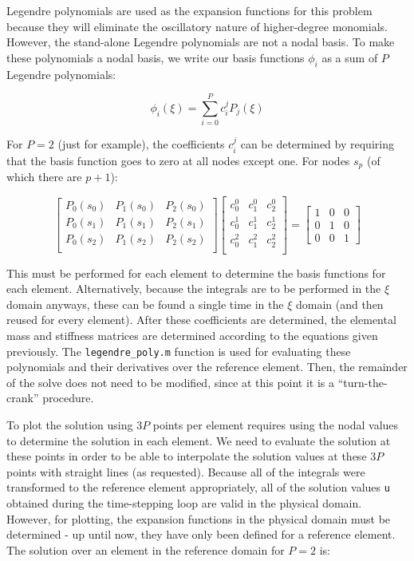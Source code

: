 \documentclass[10pt]{article}
\newcommand{\beq}{\begin{equation}}
\newcommand{\eeq}{\end{equation}}
\begin{document}
Legendre polynomials are used as the expansion functions for this problem because they will eliminate the oscillatory nature of higher-degree monomials. However, the stand-alone Legendre polynomials are not a nodal basis. To make these polynomials a nodal basis, we write our basis functions \(\phi_i\) as a sum of \(P\) Legendre polynomials:

\beq
\phi_i(\xi)=\sum_{i=0}^Pc_i^jP_j(\xi)
\eeq

For \(P=2\) (just for example), the coefficients \(c_i^j\) can be determined by requiring that the basis function goes to zero at all nodes except one. For nodes \(s_p\) (of which there are \(p+1\)):

\beq
\begin{bmatrix}
P_0(s_0) & P_1(s_0) & P_2(s_0)\\
P_0(s_1) & P_1(s_1) & P_2(s_1)\\
P_0(s_2) & P_1(s_2) & P_2(s_2)\\
\end{bmatrix}
\begin{bmatrix}
c_0^0 & c_1^0 & c_2^0\\
c_0^1 & c_1^1 & c_2^1\\
c_0^2 & c_1^2 & c_2^2\\
\end{bmatrix}=
\begin{bmatrix}
1 & 0 & 0\\
0 & 1 & 0\\
0 & 0 & 1
\end{bmatrix}
\eeq

This must be performed for each element to determine the basis functions for each element. Alternatively, because the integrals are to be performed in the \(\xi\) domain anyways, these can be found a single time in the \(\xi\) domain (and then reused for every element). After these coefficients are determined, the elemental mass and stiffness matrices are determined according to the equations given previously. The {\tt legendre\_poly.m} function is used for evaluating these polynomials and their derivatives over the reference element. Then, the remainder of the solve does not need to be modified, since at this point it is a ``turn-the-crank'' procedure.

To plot the solution using \(3P\) points per element requires using the nodal values to determine the solution in each element. We need to evaluate the solution at these points in order to be able to interpolate the solution values at these \(3P\) points with straight lines (as requested). Because all of the integrals were transformed to the reference element appropriately, all of the solution values {\tt u} obtained during the time-stepping loop are valid in the physical domain. However, for plotting, the expansion functions in the physical domain must be determined - up until now, they have only been defined for a reference element. The solution over an element in the reference domain for \(P=2\) is:
\end{document}
